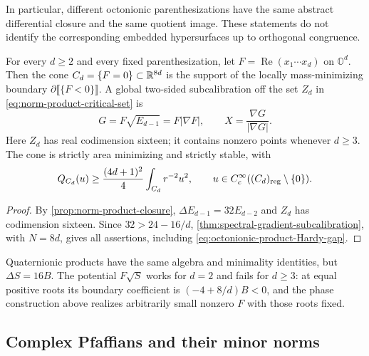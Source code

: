 In particular, different octonionic parenthesizations have the same
abstract differential closure and the same quotient image.  These
statements do not identify the corresponding embedded hypersurfaces
up to orthogonal congruence.

\begin{theorem}
\label{thm:octonionic-product-minimizing}
For every \(d\ge2\) and every fixed parenthesization, let
\(F=\operatorname{Re}(x_1\cdots x_d)\) on \(\mathbb O^d\).
Then the cone \(C_d=\{F=0\}\subset\mathbb R^{8d}\) is the support of the
locally mass-minimizing boundary \(\partial\llbracket\{F<0\}\rrbracket\).
A global two-sided subcalibration off the set \(Z_d\) in
\eqref{eq:norm-product-critical-set} is
\begin{equation}\label{eq:octonionic-product-potential}
 G=F\sqrt{E_{d-1}}=F|\nabla F|,
 \qquad X=\frac{\nabla G}{|\nabla G|}.
\end{equation}
Here \(Z_d\) has real codimension sixteen; it contains nonzero
points whenever \(d\ge3\). The cone is strictly area minimizing
and strictly stable, with
\begin{equation}\label{eq:octonionic-product-Hardy-gap}
 Q_{C_d}(u)\ge\frac{(4d+1)^2}{4}\int_{C_d}r^{-2}u^2,
 \qquad u\in C_c^\infty((C_d)_{\mathrm{reg}}\setminus\{0\}).
\end{equation}
\end{theorem}

\begin{proof}
By \cref{prop:norm-product-closure}, \(\Delta E_{d-1}=32E_{d-2}\)
and \(Z_d\) has codimension sixteen. Since \(32>24-16/d\),
\cref{thm:spectral-gradient-subcalibration}, with \(N=8d\), gives
all assertions, including \eqref{eq:octonionic-product-Hardy-gap}.
\end{proof}

\begin{remark}
\label{rem:quaternionic-product-threshold}
Quaternionic products have the same algebra and minimality identities,
but \(\Delta S=16B\). The potential \(F\sqrt S\) works for \(d=2\)
and fails for \(d\ge3\): at equal positive roots its boundary
coefficient is \((-4+8/d)B<0\), and the phase construction above
realizes arbitrarily small nonzero \(F\) with those roots fixed.
\end{remark}

\subsection{Complex Pfaffians and their minor norms}

